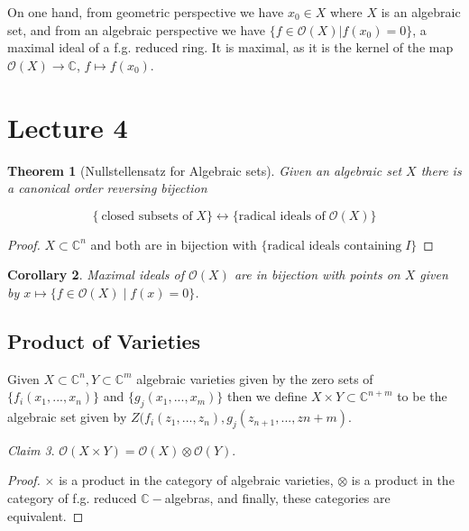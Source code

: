 \documentclass[12pt]{article}
\newtheorem{theorem}{Theorem}[section]
\newtheorem{corollary}[theorem]{Corollary}
\theoremstyle{remark}
\newtheorem{claim}[theorem]{Claim}
\newcommand{\C}{\mathbb{C}}
\begin{document}
On one hand, from geometric perspective we have $x_0\in X$ where $X$ is an algebraic set, and from an algebraic perspective we have $\{f\in \mathcal{O}(X)|f(x_0)=0\}$, a maximal ideal of a f.g. reduced ring. It is maximal, as it is the kernel of the map $\mathcal{O}(X)\rightarrow \mathbb{C}$, $f\mapsto f(x_0)$.



\section{Lecture 4}

\begin{theorem}[Nullstellensatz for Algebraic sets]
Given an algebraic set $X$ there is a canonical order reversing bijection 

$$\{ \ \text{closed subsets of} \; X \} \leftrightarrow \{ \text{radical ideals of} \; \mathcal{O}(X)  \} $$
\end{theorem}
\begin{proof}
$X \subset \C^n$ and both are in bijection with $\{ \text{radical ideals containing} \; I \}$
\end{proof}

\begin{corollary}
Maximal ideals of $\mathcal{O}(X)$ are in bijection with points on $X$ given by $x \mapsto \{ f \in \mathcal{O}(X) \; | \; f(x) = 0 \}$.
\end{corollary}

\subsection{Product of Varieties}

Given $X \subset \C^n, Y \subset \C^m$ algebraic varieties given by the zero sets of $\{f_i(x_1,...,x_n)\}$ and $\{ g_j(x_1,...,x_m) \}$ then we define $X \times Y \subset \C^{n+m}$ to be the algebraic set given by $Z(f_i(z_1,...,z_n), g_j(z_{n+1},...,z{n+m})$.

\begin{claim}
$\mathcal{O}(X \times Y) = \mathcal{O}(X) \otimes \mathcal{O}(Y)$.
\end{claim}

\begin{proof}
$\times$ is a product in the category of algebraic varieties, $\otimes$ is a product in the category of f.g. reduced $\C-$algebras, and finally, these categories are equivalent.

\end{proof}
\end{document}
